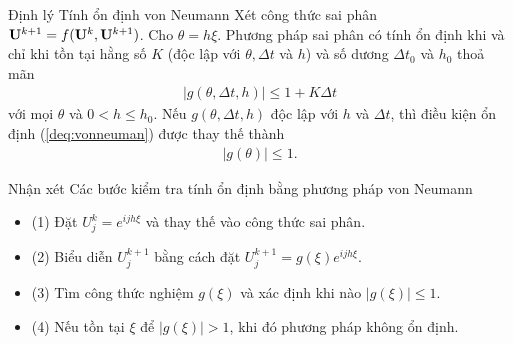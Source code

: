\documentclass[9pt]{beamer}
\numberwithin{equation}{section}
\begin{document}
\begin{frame}
\begin{block}{Định lý Tính ổn định von Neumann}
    Xét công thức sai phân ${\bf U}^{k+1} = f({\bf U}^k, {\bf U}^{k+1})$. Cho $\theta = h\xi$. Phương pháp sai phân có tính ổn định khi và chỉ khi tồn tại hằng số $K$ (độc lập với $\theta, \Delta t$ và $h$) và số dương $\Delta t_0$ và $h_0$ thoả mãn
    \begin{align}
        |g(\theta, \Delta t, h)| \le 1 + K \Delta t \label{deq:vonneuman}
    \end{align}
    với mọi $\theta$ và $0 < h \le h_0$. Nếu $g(\theta, \Delta t, h)$ độc lập với $h$ và $\Delta t$, thì điều kiện ổn định (\ref{deq:vonneuman}) được thay thế thành
    \begin{align*}
        |g(\theta)| \le 1.
    \end{align*}
\end{block}

\begin{exampleblock}{Nhận xét}
    Các bước kiểm tra tính ổn định bằng phương pháp von Neumann
    \begin{itemize}
        \item (1) Đặt $U_{j}^k = e^{ijh\xi}$ và thay thế vào công thức sai phân.
        \item (2) Biểu diễn $U_{j}^{k+1}$ bằng cách đặt $U_{j}^{k+1} = g(\xi)e^{ijh\xi}$.
        \item (3) Tìm công thức nghiệm $g(\xi)$ và xác định khi nào $|g(\xi)| \le 1$.
        \item (4) Nếu tồn tại $\xi$ để $|g(\xi)| > 1$, khi đó phương pháp không ổn định.
    \end{itemize}
\end{exampleblock}
\end{frame}
\end{document}
